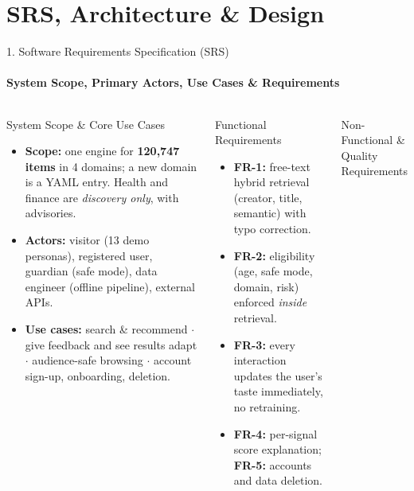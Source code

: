 \documentclass[aspectratio=169, 11pt]{beamer}
\begin{document}
\section{SRS, Architecture \& Design}

\begin{frame}{1. Software Requirements Specification (SRS)}
    \framesubtitle{System Scope, Primary Actors, Use Cases \& Requirements}
    \begin{columns}[T]
        \begin{block}{System Scope \& Core Use Cases}
            \scriptsize
            \begin{itemize}
                \item \textbf{Scope:} one engine for \textbf{120,747 items} in 4 domains; a new domain is a YAML entry. Health and finance are \emph{discovery only}, with advisories.
                \item \textbf{Actors:} visitor (13 demo personas), registered user, guardian (safe mode), data engineer (offline pipeline), external APIs.
                \item \textbf{Use cases:} search \& recommend $\cdot$ give feedback and see results adapt $\cdot$ audience-safe browsing $\cdot$ account sign-up, onboarding, deletion.
            \end{itemize}
        \end{block}
        \begin{block}{Functional Requirements}
            \scriptsize
            \begin{itemize}
                \item \textbf{FR-1:} free-text hybrid retrieval (creator, title, semantic) with typo correction.
                \item \textbf{FR-2:} eligibility (age, safe mode, domain, risk) enforced \emph{inside} retrieval.
                \item \textbf{FR-3:} every interaction updates the user's taste immediately, no retraining.
                \item \textbf{FR-4:} per-signal score explanation; \textbf{FR-5:} accounts and data deletion.
            \end{itemize}
        \end{block}
        \begin{block}{Non-Functional \& Quality Requirements}

\end{block}
\end{columns}
\end{frame}
\end{document}
